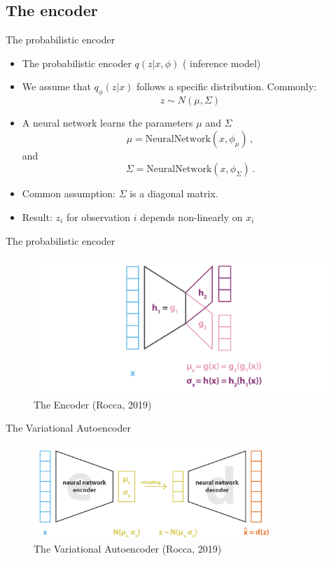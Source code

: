 \documentclass[10pt]{beamer}
\begin{document}
\subsection{The encoder}

\begin{frame}{The probabilistic encoder}

\begin{itemize}
\item The probabilistic encoder $q(z|x, \phi)$ ({\color{uured} inference model})
\pause
\item We assume that $q_\phi(z|x)$ follows a specific distribution. Commonly:
\[
z \sim N(\mu, \Sigma)
\]
\pause
\item A neural network learns the parameters $\mu$ and $\Sigma$
\[
\mu = \text{NeuralNetwork}(x,\phi_\mu)\,,
\]
and
\[
\Sigma = \text{NeuralNetwork}(x,\phi_\Sigma)\,.
\]
\pause
\item Common assumption: $\Sigma$ is a diagonal matrix.
\pause
\item {\color{uured} Result}: $z_i$ for observation $i$ depends non-linearly on $x_i$
\end{itemize}

\end{frame}

\begin{frame}{The probabilistic encoder}

\begin{figure}[h]
\centering
\includegraphics[width=1\textwidth]{fig/Rocca_VAE_encoder.png}
\caption{The Encoder (Rocca, 2019)}
\end{figure}

\end{frame}



\begin{frame}{The Variational Autoencoder}

\begin{figure}[h]
\centering
\includegraphics[width=0.8\textwidth]{fig/Rocca_VAE2.png}
\caption{The Variational Autoencoder (Rocca, 2019)}
\end{figure}

\end{frame}
\end{document}
